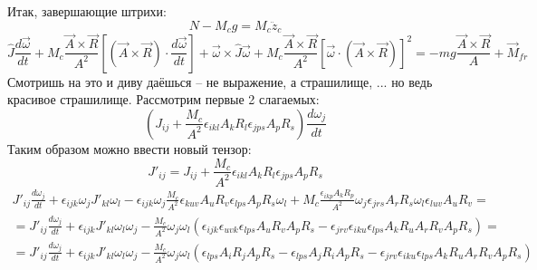 Итак, завершающие штрихи:
\[
	N - M_c g = M_c \ddot{z}_c
\]
\[
	\hat{J} \frac{d\vec{\omega}}{dt} +
	M_c \frac{\vec{A}\times\vec{R}}{A^2} \left[(\vec{A} \times \vec{R}) \cdot \frac{d\vec{\omega}}{dt} \right] + 
	\vec{\omega}\times\hat{J}\vec{\omega} + 
	M_c \frac{\vec{A}\times\vec{R}}{A^2} [\vec{\omega} \cdot (\vec{A} \times \vec{R})]^2 = - mg \frac{\vec{A}\times\vec{R}}{A} + \vec{M}_{fr}
\]
Смотришь на это и диву даёшься -- не выражение, а страшилище, ... но ведь красивое страшилище. Рассмотрим первые 2 слагаемых:
\[
	\left( J_{ij} +
	\frac{M_c}{A^2} \epsilon_{ikl} A_k R_l \epsilon_{jps} A_p R_s \right) \frac{d\omega_j}{dt}
\]
Таким образом можно ввести новый тензор:
\[
	J'_{ij} = J_{ij} +
	\frac{M_c}{A^2} \epsilon_{ikl} A_k R_l \epsilon_{jps} A_p R_s
\]
\[
	\begin{gathered}
	J'_{ij} \frac{d\omega_j}{dt} + 
	\epsilon_{ijk} \omega_j J'_{kl} \omega_l -
	\epsilon_{ijk} \omega_j \frac{M_c}{A^2} \epsilon_{kuv} A_u R_v \epsilon_{lps} A_p R_s \omega_l + 
	M_c \frac{\epsilon_{ikp} A_k R_p}{A^2} \omega_j \epsilon_{jrs} A_r R_s \omega_l \epsilon_{luv} A_u R_v 
	= \\ =
	J'_{ij} \frac{d\omega_j}{dt} + 
	\epsilon_{ijk} J'_{kl} \omega_l \omega_j  -
	\frac{M_c}{A^2} \omega_j \omega_l \left( \epsilon_{ijk} \epsilon_{uvk} \epsilon_{lps} A_u R_v A_p R_s - 
	\epsilon_{jrv} \epsilon_{iku} \epsilon_{lps}  A_k R_u A_r R_v A_p R_s \right) = \\ =
	J'_{ij} \frac{d\omega_j}{dt} + 
	\epsilon_{ijk} J'_{kl} \omega_l \omega_j  -
	\frac{M_c}{A^2} \omega_j \omega_l \left( \epsilon_{lps} A_i R_j A_p R_s - \epsilon_{lps} A_j R_i A_p R_s - 
	\epsilon_{jrv} \epsilon_{iku} \epsilon_{lps}  A_k R_u A_r R_v A_p R_s \right) 
	\end{gathered}
\]